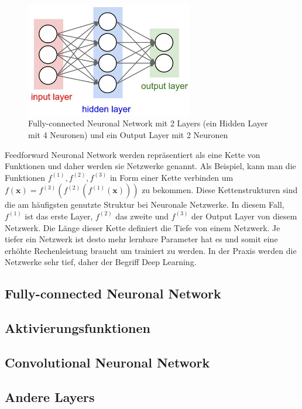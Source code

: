 \begin{figure}[H]
  \centering
  \includegraphics[width=0.65\textwidth]{resources/nn/neural_net.jpeg}
  \caption{
    Fully-connected Neuronal Network mit 2 Layers (ein Hidden Layer mit 4 Neuronen) und ein Output Layer mit 2 Neuronen 
    \cite{fully-connected-neural-network}
  }
  \label{image:neuronal-network}
\end{figure}

Feedforward Neuronal Network werden repräsentiert als eine Kette von Funktionen und daher werden sie Netzwerke genannt. Als Beispiel,
kann man die Funktionen $ f^{(1)}, f^{(2)}, f^{(3)} $ in Form einer Kette verbinden um $ f(\textbf{x}) = f^{(3)}(f^{(2)}(f^{(1)}(\textbf{x}))) $
zu bekommen. Diese Kettenstrukturen sind die am häufigsten genutzte Struktur bei Neuronale Netzwerke. In diesem Fall, $ f^{(1)} $ ist das 
erste Layer, $ f^{(2)} $ das zweite und $ f^{(3)} $ der Output Layer von diesem Netzwerk. Die Länge dieser Kette definiert die Tiefe von einem Netzwerk. Je tiefer
ein Netzwerk ist desto mehr lernbare Parameter hat es und somit eine erhöhte Rechenleistung braucht um trainiert zu werden.
In der Praxis werden die Netzwerke sehr tief, daher der Begriff Deep Learning.

\subsection{Fully-connected Neuronal Network}
\subsection{Aktivierungsfunktionen}
\subsection{Convolutional Neuronal Network}
\subsection{Andere Layers}
